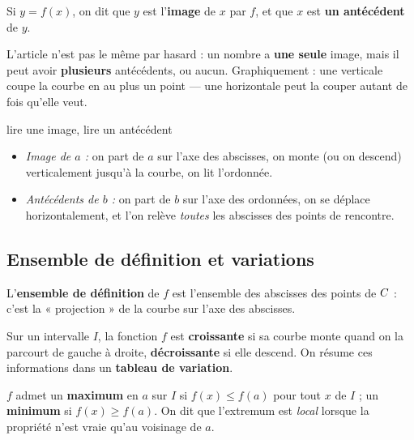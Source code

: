 \begin{definition}
Si $y = f(x)$, on dit que $y$ est l'\textbf{image} de $x$ par $f$, et que
$x$ est \textbf{un antécédent} de $y$.
\end{definition}

\begin{avertissement}
L'article n'est pas le même par hasard : un nombre a \textbf{une seule}
image, mais il peut avoir \textbf{plusieurs} antécédents, ou aucun.
Graphiquement : une verticale coupe la courbe en au plus un point — une
horizontale peut la couper autant de fois qu'elle veut.
\end{avertissement}

\begin{methode}{lire une image, lire un antécédent}
\begin{itemize}[leftmargin=1.3em, itemsep=0.2em]
  \item \emph{Image de $a$ :} on part de $a$ sur l'axe des abscisses, on
        monte (ou on descend) verticalement jusqu'à la courbe, on lit
        l'ordonnée.
  \item \emph{Antécédents de $b$ :} on part de $b$ sur l'axe des ordonnées,
        on se déplace horizontalement, et l'on relève \emph{toutes} les
        abscisses des points de rencontre.
\end{itemize}
\end{methode}

\subsection{Ensemble de définition et variations}

\begin{definition}
L'\textbf{ensemble de définition} de $f$ est l'ensemble des abscisses des
points de $C$ : c'est la « projection » de la courbe sur l'axe des
abscisses.
\end{definition}

\begin{definition}
Sur un intervalle $I$, la fonction $f$ est \textbf{croissante} si sa courbe
monte quand on la parcourt de gauche à droite, \textbf{décroissante} si elle
descend. On résume ces informations dans un \textbf{tableau de variation}.
\end{definition}

\begin{definition}[extremum]
$f$ admet un \textbf{maximum} en $a$ sur $I$ si $f(x) \leq f(a)$ pour tout
$x$ de $I$ ; un \textbf{minimum} si $f(x) \geq f(a)$. On dit que l'extremum
est \emph{local} lorsque la propriété n'est vraie qu'au voisinage de $a$.
\end{definition}

